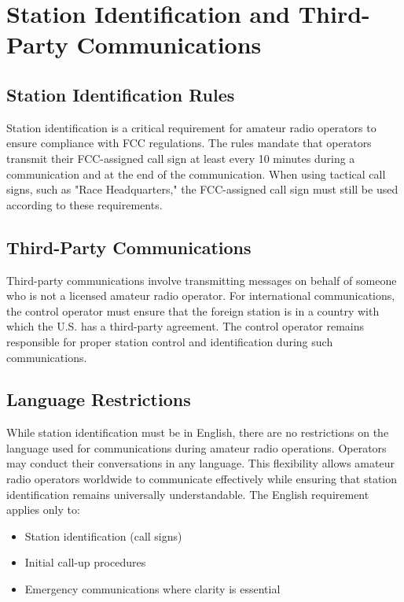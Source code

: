 \section{Station Identification and Third-Party Communications}
\label{sec:station_identification}

\subsection*{Station Identification Rules}
Station identification is a critical requirement for amateur radio operators to ensure compliance with FCC regulations. The rules mandate that operators transmit their FCC-assigned call sign at least every 10 minutes during a communication and at the end of the communication. When using tactical call signs, such as "Race Headquarters," the FCC-assigned call sign must still be used according to these requirements.

\subsection*{Third-Party Communications}
Third-party communications involve transmitting messages on behalf of someone who is not a licensed amateur radio operator. For international communications, the control operator must ensure that the foreign station is in a country with which the U.S. has a third-party agreement. The control operator remains responsible for proper station control and identification during such communications.

\subsection*{Language Restrictions}
While station identification must be in English, there are no restrictions on the language used for communications during amateur radio operations. Operators may conduct their conversations in any language. This flexibility allows amateur radio operators worldwide to communicate effectively while ensuring that station identification remains universally understandable. The English requirement applies only to:
\begin{itemize}
    \item Station identification (call signs)
    \item Initial call-up procedures
    \item Emergency communications where clarity is essential
\end{itemize}

